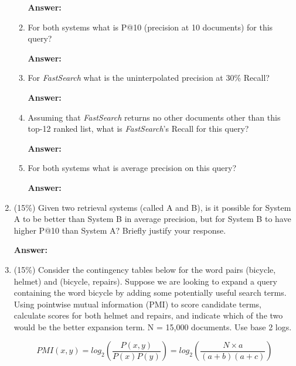 \documentclass[11pt]{article}
\begin{document}
\begin{enumerate}
\begin{enumerate}
            \textbf{Answer:}

            \item For both systems what is P@10 (precision at 10 documents) for this query?

            \textbf{Answer:}

            \item For \textit{FastSearch} what is the uninterpolated precision at 30\% Recall?

            \textbf{Answer:}

            \item Assuming that \textit{FastSearch} returns no other documents other than this top-12 ranked list, what is \textit{FastSearch}'s Recall for this query?

            \textbf{Answer:}

            \item For both systems what is average precision on this query?

            \textbf{Answer:}

        \end{enumerate}

        \item (15\%) Given two retrieval systems (called A and B), is it possible for System A to be better than System B in
        average precision, but for System B to have higher P@10 than System A? Briefly justify your response.

        \textbf{Answer:}

        \item (15\%) Consider the contingency tables below for the word pairs (bicycle, helmet) and (bicycle, repairs). Suppose we are looking to expand a query containing the word bicycle by adding some potentially useful search terms. Using pointwise mutual information (PMI) to score candidate terms, calculate scores for both helmet and repairs, and indicate which of the two would be the better expansion term. N = 15,000 documents. Use base 2 logs.

        \begin{equation*}
            PMI(x,y)=log_2\left(\frac{P(x,y)}{P(x)P(y)}\right)=log_2\left(\frac{N\times a}{(a+b)(a+c)}\right)
        \end{equation*}


\end{enumerate}
\end{document}
